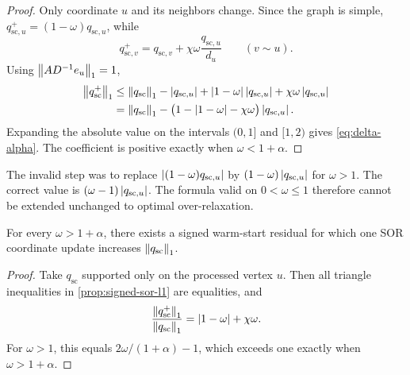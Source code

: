 \begin{proof}
Only coordinate \(u\) and its neighbors change.  Since the graph is simple,
\(q_{\mathrm{sc},u}^+=(1-\omega)q_{\mathrm{sc},u}\), while
\begin{equation}
    q_{\mathrm{sc},v}^+
    =q_{\mathrm{sc},v}+\chi\omega\frac{q_{\mathrm{sc},u}}{d_u}
    \qquad(v\sim u).
    \label{eq:sor-neighbor-update}
\end{equation}
Using \(\left\lVert AD^{-1}e_u\right\rVert_1=1\),
\begin{align*}
  \left\lVert q_{\mathrm{sc}}^+\right\rVert_1
  &\leq
  \left\lVert q_{\mathrm{sc}}\right\rVert_1-\left\lvert q_{\mathrm{sc},u}\right\rvert
  +\left\lvert 1-\omega\right\rvert\left\lvert q_{\mathrm{sc},u}\right\rvert
  +\chi\omega\left\lvert q_{\mathrm{sc},u}\right\rvert\\
  &=\left\lVert q_{\mathrm{sc}}\right\rVert_1-
    \bigl(1-\left\lvert 1-\omega\right\rvert-\chi\omega\bigr)\left\lvert q_{\mathrm{sc},u}\right\rvert.
\end{align*}
Expanding the absolute value on the intervals \((0,1]\) and \([1,2)\)
gives \cref{eq:delta-alpha}.  The coefficient is positive exactly when
\(\omega<1+\alpha\).
\end{proof}

\begin{remark}
The invalid step was to replace
\(
\left\lvert (1-\omega)q_{\mathrm{sc},u}\right\rvert
\)
by
\(
(1-\omega)\left\lvert q_{\mathrm{sc},u}\right\rvert
\)
for \(\omega>1\).  The correct value is
\((\omega-1)\left\lvert q_{\mathrm{sc},u}\right\rvert\).  The formula valid on \(0<\omega\leq1\) therefore
cannot be extended unchanged to optimal over-relaxation.
\end{remark}

\begin{proposition}
\label{prop:sor-l1-sharp}
For every \(\omega>1+\alpha\), there exists a signed warm-start residual for
which one SOR coordinate update increases \(\left\lVert q_{\mathrm{sc}}\right\rVert_1\).
\end{proposition}

\begin{proof}
Take \(q_{\mathrm{sc}}\) supported only on the processed vertex \(u\).  Then all triangle
inequalities in \cref{prop:signed-sor-l1} are equalities, and
\begin{equation}
    \frac{\left\lVert q_{\mathrm{sc}}^+\right\rVert_1}{\left\lVert q_{\mathrm{sc}}\right\rVert_1}
    =\left\lvert 1-\omega\right\rvert+\chi\omega.
    \label{eq:sor-supported-ratio}
\end{equation}
For \(\omega>1\), this equals
\(
2\omega/(1+\alpha)-1
\), which exceeds one exactly when \(\omega>1+\alpha\).
\end{proof}

